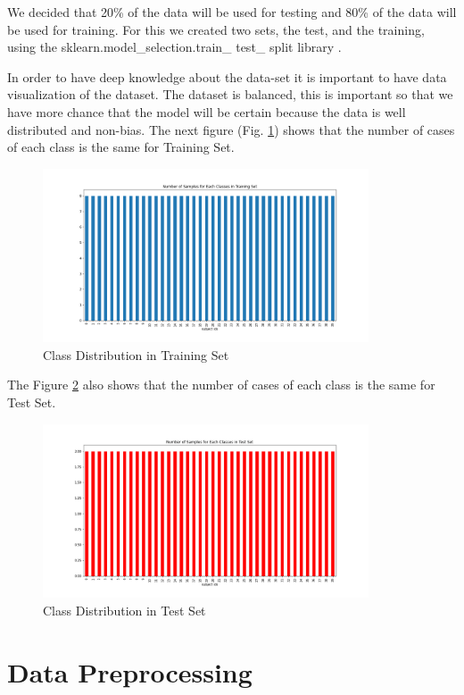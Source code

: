 \documentclass[conference]{IEEEtran}
\begin{document}
We decided that 20\% of the data will be used for testing and 80\% of the data will be used for training. For this we created two sets, the test, and the training, using the sklearn.model\_selection.train\_ test\_ split library \cite{train-test-split}.

In order to have deep knowledge about the data-set it is important to have data visualization of the dataset.
The dataset is balanced, this is important so that we have more chance that the model will be certain because the data is well distributed and non-bias. The next figure (Fig. \ref{img:samples_per_class_train}) shows that the number of cases of each class is the same for Training Set.

\begin{figure}[!h]
    \centering
    \includegraphics[width=3.8in]{samples_per_class_train.png}
    \caption{Class Distribution in Training Set}
    \label{img:samples_per_class_train}
\end{figure}

The Figure \ref{img:samples_per_class_test.png} also shows that the number of cases of each class is the same for Test Set.

\begin{figure}[!h]
    \centering
    \includegraphics[width=3.8in]{samples_per_class_test.png}
    \caption{Class Distribution in Test Set}
    \label{img:samples_per_class_test.png}
\end{figure}


\section{Data Preprocessing}
\end{document}
